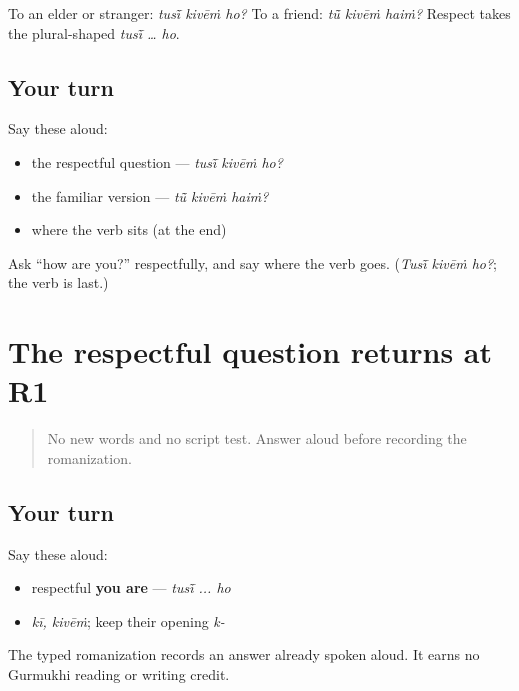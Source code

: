 \begin{grammarlens}[title={Grammar Lens: match the \textquotedblleft{}you\textquotedblright{} to the verb}]
To an elder or stranger: \emph{tusī̃ kivēṁ ho?} To a friend: \emph{tū̃ kivēṁ haiṁ?} Respect takes the plural-shaped \emph{tusī̃ … ho}.
\end{grammarlens}

\subsection*{Your turn}
Say these aloud:

\begin{itemize}
\raggedright
  \item the respectful question — \emph{tusī̃ kivēṁ ho?}
  \item the familiar version — \emph{tū̃ kivēṁ haiṁ?}
  \item where the verb sits (at the end)
\end{itemize}

\begin{tcolorbox}[breakable,colback=teal!4,colframe=teal!35!black,title={Before you move on}]
Ask \textquotedblleft{}how are you?\textquotedblright{} respectfully, and say where the verb goes. (\emph{Tusī̃ kivēṁ ho?}; the verb is last.)
\end{tcolorbox}
\section[Practice]{The respectful question returns at R1}

\label{lesson:PA-R03-wellbeing-r1}



\begin{quote}
No new words and no script test. Answer aloud before recording the romanization.
\end{quote}

\subsection*{Your turn}
Say these aloud:

\begin{itemize}
\raggedright
  \item respectful \textbf{you are} — \emph{tusī̃ ... ho}
  \item \emph{kī, kivēṁ}; keep their opening \emph{k-}
\end{itemize}

The typed romanization records an answer already spoken aloud. It earns no Gurmukhi reading or writing credit.

